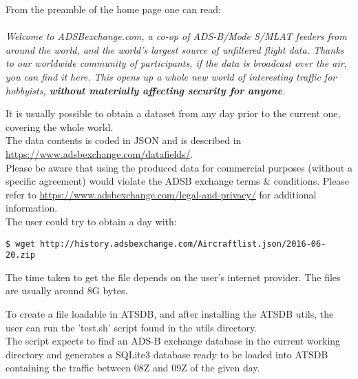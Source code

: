 From the preamble of the home page one can read: \\\\
\textit{Welcome to ADSBexchange.com, a co-op of ADS-B/Mode S/MLAT feeders from around the world, and the world's largest source of unfiltered flight data.  Thanks to our worldwide community of participants, if the data is broadcast over the air, you can find it here.  This opens up a whole new world of interesting traffic for hobbyists, \textbf{without materially affecting security for anyone}. \\}

It is usually possible to obtain a dataset from any day prior to the current one, covering the whole world. \\

The data contents is coded in JSON and is described in \url{https://www.adsbexchange.com/datafields/}. \\

Please be aware that using the produced data for commercial purposes (without a specific agreement) would violate the ADSB exchange terms \& conditions. Please refer to \url{https://www.adsbexchange.com/legal-and-privacy/} for additional information.\\

The user could try to obtain a day with:
\begin{verbatim}
$ wget http://history.adsbexchange.com/Aircraftlist.json/2016-06-20.zip
\end{verbatim}

The time taken to get the file depends on the user's internet provider. The files are usually around 8G bytes.

To create a file loadable in ATSDB, and after installing the ATSDB utils, the user can run the 'test.sh' script found in the utils directory. \\

The script expects to find an ADS-B exchange database in the current working directory and generates a SQLite3 database ready to be loaded into ATSDB containing the traffic between 08Z and 09Z of the given day.
